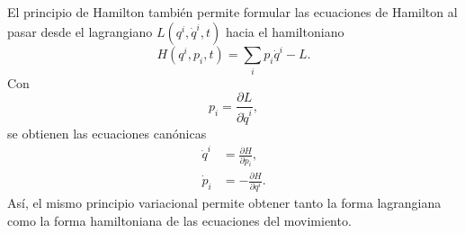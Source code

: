 \documentclass[../apunte_mecanica_clasica.tex]{subfiles}%
\begin{document}
El principio de Hamilton también permite formular las ecuaciones de Hamilton al pasar desde el lagrangiano $L(q^i,\dot q^i,t)$ hacia el hamiltoniano
\begin{equation}
    H(q^i,p_i,t)=\sum_i p_i\dot q^i-L.
    \label{eq:ph-hamiltoniano-def}
\end{equation}
Con
\begin{equation}
    p_i=\frac{\partial L}{\partial \dot q^i},
    \label{eq:ph-momento-canonico}
\end{equation}
se obtienen las ecuaciones canónicas
\begin{align}
    \dot q^i &= \frac{\partial H}{\partial p_i},
    \label{eq:ph-hamilton-q}\\
    \dot p_i &= -\frac{\partial H}{\partial q^i}.
    \label{eq:ph-hamilton-p}
\end{align}
Así, el mismo principio variacional permite obtener tanto la forma lagrangiana como la forma hamiltoniana de las ecuaciones del movimiento.
\end{document}
